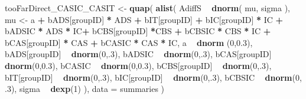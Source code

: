 \documentclass[10pt,dvipsnames,enabledeprecatedfontcommands]{scrartcl}
\newenvironment{Shaded}{\begin{snugshade}}{\end{snugshade}}
\newcommand{\KeywordTok}[1]{\textcolor[rgb]{0.13,0.29,0.53}{\textbf{#1}}}
\newcommand{\DataTypeTok}[1]{\textcolor[rgb]{0.13,0.29,0.53}{#1}}
\newcommand{\DecValTok}[1]{\textcolor[rgb]{0.00,0.00,0.81}{#1}}
\newcommand{\FloatTok}[1]{\textcolor[rgb]{0.00,0.00,0.81}{#1}}
\newcommand{\StringTok}[1]{\textcolor[rgb]{0.31,0.60,0.02}{#1}}
\newcommand{\OperatorTok}[1]{\textcolor[rgb]{0.81,0.36,0.00}{\textbf{#1}}}
\newcommand{\NormalTok}[1]{#1}
\begin{document}
\begin{Shaded}
\begin{Highlighting}[]
\NormalTok{tooFarDirect_CASIC_CASIT <-}\StringTok{ }\KeywordTok{quap}\NormalTok{(}
  \KeywordTok{alist}\NormalTok{(}
\NormalTok{    AdiffS }\OperatorTok{~}\StringTok{ }\KeywordTok{dnorm}\NormalTok{( mu, sigma ),}
\NormalTok{    mu <-}\StringTok{ }\NormalTok{a }\OperatorTok{+}\StringTok{ }\NormalTok{bADS[groupID] }\OperatorTok{*}\StringTok{ }\NormalTok{ADS }\OperatorTok{+}\StringTok{  }\NormalTok{bIT[groupID] }\OperatorTok{+}\StringTok{ }\NormalTok{bIC[groupID] }\OperatorTok{*}\StringTok{ }\NormalTok{IC }\OperatorTok{+}\StringTok{ }
\StringTok{      }\NormalTok{bADSIC }\OperatorTok{*}\StringTok{ }\NormalTok{ADS }\OperatorTok{*}\StringTok{ }\NormalTok{IC}\OperatorTok{+}\StringTok{ }\NormalTok{bCBS[groupID] }\OperatorTok{*}\NormalTok{CBS }\OperatorTok{+}\StringTok{ }\NormalTok{bCBSIC }\OperatorTok{*}\StringTok{ }\NormalTok{CBS }\OperatorTok{*}\StringTok{ }\NormalTok{IC }\OperatorTok{+}\StringTok{ }\NormalTok{bCAS[groupID] }\OperatorTok{*}\StringTok{ }\NormalTok{CAS }\OperatorTok{+}\StringTok{ }\NormalTok{bCASIC }\OperatorTok{*}\StringTok{ }\NormalTok{CAS }\OperatorTok{*}\StringTok{ }\NormalTok{IC, }
\NormalTok{    a }\OperatorTok{~}\StringTok{ }\KeywordTok{dnorm}\NormalTok{ (}\DecValTok{0}\NormalTok{,}\FloatTok{0.3}\NormalTok{),}
\NormalTok{    bADS[groupID] }\OperatorTok{~}\StringTok{ }\KeywordTok{dnorm}\NormalTok{(}\DecValTok{0}\NormalTok{,.}\DecValTok{3}\NormalTok{),}
\NormalTok{    bADSIC }\OperatorTok{~}\StringTok{ }\KeywordTok{dnorm}\NormalTok{(}\DecValTok{0}\NormalTok{,.}\DecValTok{3}\NormalTok{),}
\NormalTok{    bCAS[groupID] }\OperatorTok{~}\StringTok{ }\KeywordTok{dnorm}\NormalTok{(}\DecValTok{0}\NormalTok{,}\FloatTok{0.3}\NormalTok{),}
\NormalTok{    bCASIC }\OperatorTok{~}\StringTok{ }\KeywordTok{dnorm}\NormalTok{(}\DecValTok{0}\NormalTok{,}\FloatTok{0.3}\NormalTok{),}
\NormalTok{    bCBS[groupID] }\OperatorTok{~}\StringTok{ }\KeywordTok{dnorm}\NormalTok{(}\DecValTok{0}\NormalTok{,.}\DecValTok{3}\NormalTok{),}
\NormalTok{    bIT[groupID] }\OperatorTok{~}\StringTok{ }\KeywordTok{dnorm}\NormalTok{(}\DecValTok{0}\NormalTok{,.}\DecValTok{3}\NormalTok{),}
\NormalTok{    bIC[groupID] }\OperatorTok{~}\StringTok{ }\KeywordTok{dnorm}\NormalTok{(}\DecValTok{0}\NormalTok{,.}\DecValTok{3}\NormalTok{),}
\NormalTok{    bCBSIC }\OperatorTok{~}\StringTok{ }\KeywordTok{dnorm}\NormalTok{(}\DecValTok{0}\NormalTok{, }\FloatTok{.3}\NormalTok{),}
\NormalTok{    sigma  }\OperatorTok{~}\StringTok{ }\KeywordTok{dexp}\NormalTok{(}\DecValTok{1}\NormalTok{)}
\NormalTok{  ), }
  \DataTypeTok{data =}\NormalTok{ summaries}
\NormalTok{)}









\end{Highlighting}
\end{Shaded}
\end{document}
